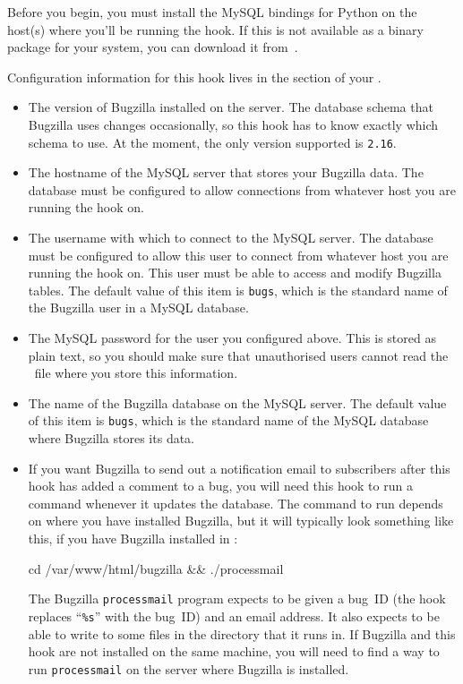 Before you begin, you must install the MySQL bindings for Python on
the host(s) where you'll be running the hook.  If this is not
available as a binary package for your system, you can download it
from~\cite{web:mysql-python}.

Configuration information for this hook lives in the
 section of your \hgrc.
\begin{itemize}
\item[\rcitem{bugzilla}{version}] The version of Bugzilla installed on
  the server.  The database schema that Bugzilla uses changes
  occasionally, so this hook has to know exactly which schema to use.
  At the moment, the only version supported is \texttt{2.16}.
\item[\rcitem{bugzilla}{host}] The hostname of the MySQL server that
  stores your Bugzilla data.  The database must be configured to allow
  connections from whatever host you are running the 
  hook on.
\item[\rcitem{bugzilla}{user}] The username with which to connect to
  the MySQL server.  The database must be configured to allow this
  user to connect from whatever host you are running the
   hook on.  This user must be able to access and
  modify Bugzilla tables.  The default value of this item is
  \texttt{bugs}, which is the standard name of the Bugzilla user in a
  MySQL database.
\item[\rcitem{bugzilla}{password}] The MySQL password for the user you
  configured above.  This is stored as plain text, so you should make
  sure that unauthorised users cannot read the \hgrc\ file where you
  store this information.
\item[\rcitem{bugzilla}{db}] The name of the Bugzilla database on the
  MySQL server.  The default value of this item is \texttt{bugs},
  which is the standard name of the MySQL database where Bugzilla
  stores its data.
\item[\rcitem{bugzilla}{notify}] If you want Bugzilla to send out a
  notification email to subscribers after this hook has added a
  comment to a bug, you will need this hook to run a command whenever
  it updates the database.  The command to run depends on where you
  have installed Bugzilla, but it will typically look something like
  this, if you have Bugzilla installed in
  :
  \begin{codesample4}
    cd /var/www/html/bugzilla && ./processmail %
  \end{codesample4}
  The Bugzilla \texttt{processmail} program expects to be given a
  bug~ID (the hook replaces ``\texttt{\%s}'' with the bug~ID) and an
  email address.  It also expects to be able to write to some files in
  the directory that it runs in.  If Bugzilla and this hook are not
  installed on the same machine, you will need to find a way to run
  \texttt{processmail} on the server where Bugzilla is installed.
\end{itemize}

